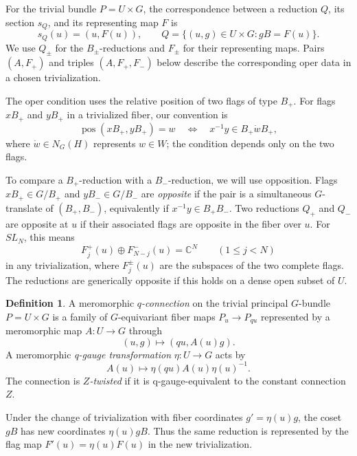 \documentclass[11pt,leqno]{amsart}
\numberwithin{equation}{section}
\theoremstyle{plain}
\theoremstyle{definition}
\newtheorem{definition}[theorem]{Definition}
\theoremstyle{plain}
\theoremstyle{definition}
\theoremstyle{remark}
\begin{document}
For the trivial bundle $P=U\times G$, the correspondence between a reduction $Q$, its section $s_Q$, and its representing map $F$ is
\[
 s_Q(u)=(u,F(u)),\qquad
 Q=\{(u,g)\in U\times G:gB=F(u)\}.
\]
We use $Q_\pm$ for the $B_\pm$-reductions and $F_\pm$ for their representing maps.  Pairs $(A,F_+)$ and triples $(A,F_+,F_-)$ below describe the corresponding oper data in a chosen trivialization.

The oper condition uses the relative position of two flags of type $B_+$. For flags $xB_+$ and $yB_+$ in a trivialized fiber, our convention is
\[
 \operatorname{pos}(xB_+,yB_+)=w
 \quad\Longleftrightarrow\quad
 x^{-1}y\in B_+\dot wB_+,
\]
where $\dot w\in N_G(H)$ represents $w\in W$; the condition depends only on the two flags.

To compare a $B_+$-reduction with a $B_-$-reduction, we will use opposition. Flags $xB_+\in G/B_+$ and $yB_-\in G/B_-$ are \emph{opposite} if the pair is a simultaneous $G$-translate of $(B_+,B_-)$, equivalently if $x^{-1}y\in B_+B_-$.  Two reductions $Q_+$ and $Q_-$ are opposite at $u$ if their associated flags are opposite in the fiber over $u$.  For $SL_N$, this means
\[
 F_j^+(u)\oplus F_{N-j}^-(u)=\mathbb C^N
 \qquad(1\le j<N)
\]
in any trivialization, where $F_j^\pm(u)$ are the subspaces of the two complete flags.  The reductions are generically opposite if this holds on a dense open subset of $U$.

\begin{definition}\label{def:q-connection}
A meromorphic \emph{$q$-connection} on the trivial principal $G$-bundle $P=U\times G$ is a family of $G$-equivariant fiber maps $P_u\to P_{qu}$ represented by a meromorphic map $A:U\to G$ through
\[
 (u,g)\longmapsto(qu,A(u)g).
\]
A meromorphic \emph{q-gauge transformation} $\eta:U\to G$ acts by
\[
 A(u)\longmapsto\eta(qu)A(u)\eta(u)^{-1}.
\]
The connection is \emph{$Z$-twisted} if it is q-gauge-equivalent to the constant connection $Z$.
\end{definition}

Under the change of trivialization with fiber coordinates $g'=\eta(u)g$, the coset $gB$ has new coordinates $\eta(u)gB$.  Thus the same reduction is represented by the flag map $F'(u)=\eta(u)F(u)$ in the new trivialization.
\end{document}
